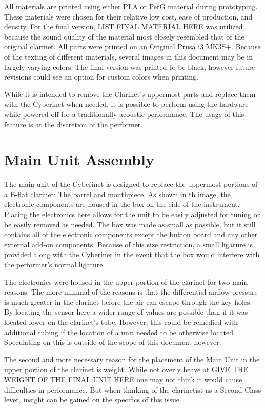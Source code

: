 All materials are printed using either PLA or PetG material during prototyping. These materials were chosen for their relative low cost, ease of production, and density. For the final version, LIST FINAL MATERIAL HERE was utilized because the sound quality of the material most closely resembled that of the original clarinet. All parts were printed on an Original Prusa i3 MK3S+. Because of the texting of different materials, several images in this document may be in largely varying colors. The final version was printed to be black, however future revisions could see an option for custom colors when printing. 

While it is intended to remove the Clarinet's uppermost parts and replace them with the Cyberinet when needed, it is possible to perform using the hardware while powered off for a traditionally acoustic performance. The usage of this feature is at the discretion of the performer.

\section{Main Unit Assembly}

The main unit of the Cyberinet is designed to replace the uppermost portions of a B-flat clarinet: The barrel and mouthpiece. As shown in th image, the electronic components are housed in the box on the side of the instrument. Placing the electronics here allows for the unit to be easily adjusted for tuning or be easily removed as needed. The box was made as small as possible, but it still contains all of the electronic components except the button board and any other external add-on components. Because of this size restriction, a small ligature is provided along with the Cyberinet in the event that the box would interfere with the performer's normal ligature.

The electronics were housed in the upper portion of the clarinet for two main reasons. The more minimal of the reasons is that the differential airflow pressure is much greater in the clarinet before the air can escape through the key holes. By locating the sensor here a wider range of values are possible than if it was located lower on the clarinet's tube. However, this could be remedied with additional tubing if the location of a unit needed to be otherwise located. Speculating on this is outside of the scope of this document however.

The second and more necessary reason for the placement of the Main Unit in the upper portion of the clarinet is weight. While not overly heave at GIVE THE WEIGHT OF THE FINAL UNIT HERE one may not think it would cause difficulties in performance. But when thinking of the clarinetist as a Second Class lever, insight can be gained on the specifics of this issue.

